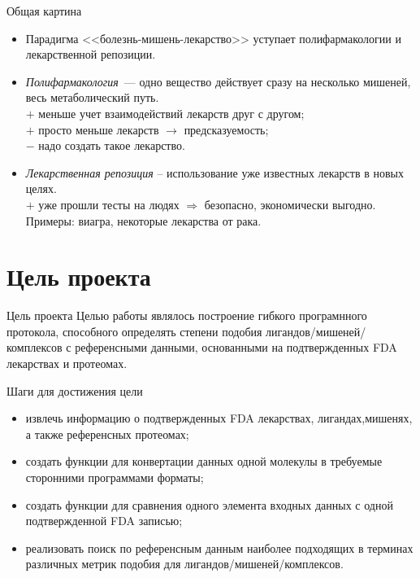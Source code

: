 \documentclass[14pt]{beamer}
\begin{document}
\begin{frame}{Общая картина}
	\begin{itemize}
		\normalsize
		\item Парадигма <<болезнь-мишень-лекарство>> уступает полифармакологии и лекарственной репозиции.
		\small
		\item \textit{Полифармакология}~--- одно вещество действует сразу на несколько мишеней, весь метаболический путь.\\
		$+$ меньше учет взаимодействий лекарств друг с другом;\\
		$+$ просто меньше лекарств $\rightarrow$ предсказуемость;\\
		$-$ надо создать такое лекарство.\\
		\item \textit{Лекарственная репозиция} – использование уже известных лекарств в новых целях.\\ 
		$+$ уже прошли тесты на людях $\Rightarrow$ безопасно, экономически выгодно.\\
		Примеры: виагра, некоторые лекарства от рака.
	\end{itemize}
\end{frame}

\section{Цель проекта}
\begin{frame}{Цель проекта}
	\linespread{1.35}
	\centering
    Целью работы являлось построение гибкого програмнного протокола, способного определять степени подобия лигандов/мишеней/комплексов с референсными данными, основанными на подтвержденных FDA лекарствах и протеомах.
	\small
\end{frame}

\begin{frame}{Шаги для достижения цели}	
	\begin{itemize}
		\item извлечь информацию о подтвержденных FDA лекарствах, лигандах,мишенях, а также референсных протеомах;
		\item создать функции для конвертации данных одной молекулы в требуемые сторонними программами форматы;
		\item создать функции для сравнения одного элемента входных данных с одной подтвержденной FDA записью;
		\item реализовать поиск по референсным данным наиболее подходящих в терминах различных метрик подобия для лигандов/мишеней/комплексов.
	\end{itemize}
\end{frame}
\end{document}
